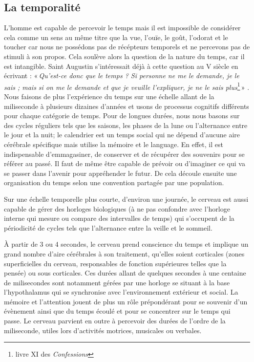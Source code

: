 \documentclass[12pt,fleqn,oneside,openany]{book} %
\begin{document}
\subsection[La temporalité]{La temporalité \cite{reptemps,basePerception,perceptionTemps,tempsEtIllusions}} \label{ssec:temporalite} %

L'homme est capable de percevoir le temps mais il est impossible de considérer cela comme un sens au même titre que la vue, l'ouïe, le goût, l'odorat et le toucher car nous ne possédons pas de récépteurs temporels et ne percevons pas de stimuli à son propos. Cela soulève alors la question de la nature du temps, car il est intangible. Saint Augustin s'intéressait déjà à cette question au V siècle en écrivant : «\,\emph{Qu’est-ce donc que le temps ? Si personne ne me le demande, je le sais ; mais si on me le demande et que je veuille l’expliquer, je ne le sais plus}\footnote{livre XI des \emph{Confessions}}\,» \cite{augustin}. Nous faisons de plus l'expérience du temps sur une échelle allant de la miliseconde à plusieurs dizaines d'années et usons de processus cognitifs différents pour chaque catégorie de temps. Pour de longues durées, nous nous basons sur des cycles réguliers tels que les saisons, les phases de la lune ou l'alternance entre le jour et la nuit; le calendrier est un temps social qui ne dépend d'aucune aire cérébrale spécifique mais utilise la mémoire et le language. En effet, il est indispensable d'emmagasiner, de conserver et de récupérer des souvenirs pour se référer au passé. Il faut de même être capable de prévoir ou d'imaginer ce qui va se passer dans l'avenir pour appréhender le futur. De cela découle ensuite une organisation du temps selon une convention partagée par une population.

Sur une échelle temporelle plus courte, d'environ une journée, le cerveau est aussi capable de gérer des horloges biologiques (à ne pas confondre avec l'horloge interne qui mesure ou compare des intervalles de temps) qui s'occupent de la périodicité de cycles tels que l'alternance entre la veille et le sommeil. 

À partir de 3 ou 4 secondes, le cerveau prend conscience du temps et implique un grand nombre d'aire cérébrales à son traitement, qu'elles soient corticales (zones superficielles du cerveau, responsables de fonction supérieures telles que la pensée) ou sous corticales. Ces durées allant de quelques secondes à une centaine de milisecondes sont notamment gérées par une horloge se situant à la base l'hypothalamus qui se synchronise avec l'environnement extérieur et social. La mémoire et l'attention jouent de plus un rôle prépondérant pour se souvenir d'un évènement ainsi que du temps écoulé et pour se concentrer sur le temps qui passe. Le cerveau parvient en outre à percevoir des durées de l'ordre de la miliseconde, utiles lors d'activités motrices, musicales ou verbales.
\end{document}
